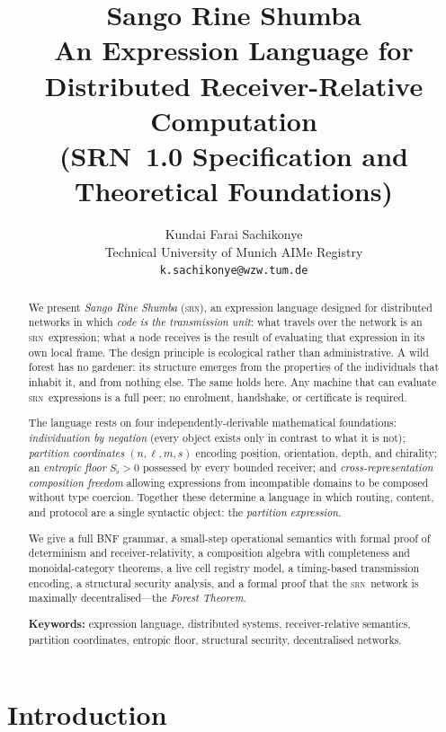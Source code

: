 \documentclass[twocolumn,11pt,a4paper]{article}
\title{\textbf{Sango Rine Shumba}\\[4pt]
\large An Expression Language for Distributed Receiver-Relative Computation\\[2pt]
\normalsize (SRN~1.0 Specification and Theoretical Foundations)}
\author{Kundai Farai Sachikonye\\
\small Technical University of Munich \quad AIMe Registry\\
\small \texttt{k.sachikonye@wzw.tum.de}}
\date{}
\theoremstyle{definition}
\theoremstyle{remark}
\newcommand{\srn}{\textsc{srn}}
\newcommand{\floor}{S_{\flat}}
\begin{document}
\maketitle

\begin{abstract}
We present \emph{Sango Rine Shumba} (\srn), an expression language
designed for distributed networks in which \emph{code is the
transmission unit}: what travels over the network is an \srn\
expression; what a node receives is the result of evaluating that
expression in its own local frame.  The design principle is ecological
rather than administrative.  A wild forest has no gardener: its
structure emerges from the properties of the individuals that inhabit
it, and from nothing else.  The same holds here.  Any machine that
can evaluate \srn\ expressions is a full peer; no enrolment,
handshake, or certificate is required.

The language rests on four independently-derivable mathematical
foundations: \emph{individuation by negation} (every object exists only
in contrast to what it is not); \emph{partition coordinates}
$(n,\ell,m,s)$ encoding position, orientation, depth, and chirality;
an \emph{entropic floor} $\floor > 0$ possessed by every bounded
receiver; and \emph{cross-representation composition freedom} allowing
expressions from incompatible domains to be composed without type
coercion.  Together these determine a language in which routing,
content, and protocol are a single syntactic object: the
\emph{partition expression}.

We give a full BNF grammar, a small-step operational semantics with
formal proof of determinism and receiver-relativity, a composition
algebra with completeness and monoidal-category theorems, a live cell
registry model, a timing-based transmission encoding, a structural
security analysis, and a formal proof that the \srn\ network is
maximally decentralised---the \emph{Forest Theorem}.

\textbf{Keywords:} expression language, distributed systems, receiver-relative
semantics, partition coordinates, entropic floor, structural security,
decentralised networks.
\end{abstract}

\section{Introduction}
\label{sec:intro}
\end{document}
